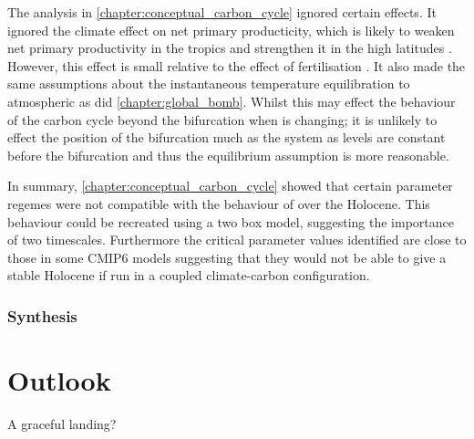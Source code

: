 The analysis in \cref{chapter:conceptual_carbon_cycle} ignored certain effects. It ignored the climate effect on net primary producticity, which is likely to weaken
net primary productivity in the tropics and strengthen it in the high latitudes .
However, this effect is small relative to the effect of  fertilisation \parencite{Arora2020}.
It also made the same assumptions about the instantaneous temperature equilibration to atmospheric  as did \cref{chapter:global_bomb}.
Whilst this may effect the behaviour of the carbon cycle beyond the bifurcation when  is changing;
it is unlikely to effect the position of the bifurcation much as the system as  levels are constant before the bifurcation and thus the equilibrium assumption is more reasonable.

In summary, \cref{chapter:conceptual_carbon_cycle} showed that certain parameter regemes were not compatible with the behaviour of  over the Holocene.
This behaviour could be recreated using a two box model, suggesting the importance of two timescales. Furthermore the critical parameter values identified are close to those in
some CMIP6 models suggesting that they would not be able to give a stable Holocene if run in a coupled climate-carbon configuration.

\subsubsection{}



\subsubsection{}

\subsubsection{Synthesis}

\section{Outlook}

A graceful landing?